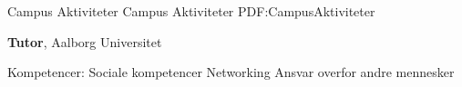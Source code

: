 

\Section
{Campus Aktiviteter}
{Campus Aktiviteter}
{PDF:CampusAktiviteter}

\Entry
\textbf{Tutor},
Aalborg Universitet
\hfill
{}
\begin{Detail}
Kompetencer:
\SubBulletItem
Sociale kompetencer
\SubBulletItem
Networking
\SubBulletItem
Ansvar overfor andre mennesker

\end{Detail}
\BigGap
